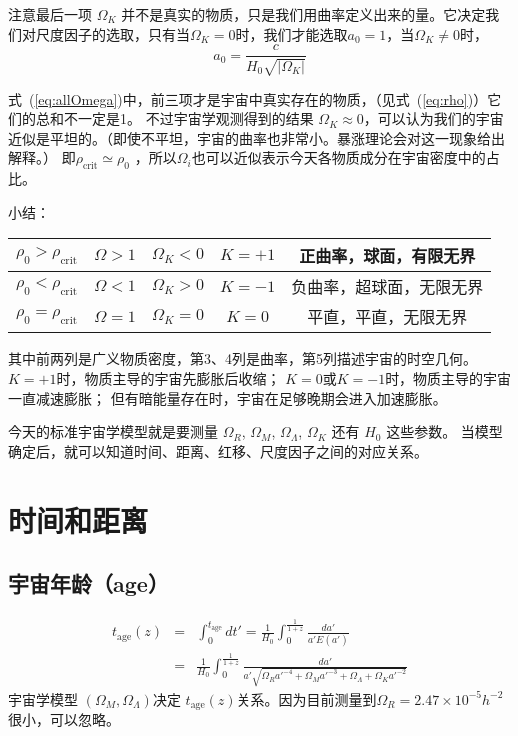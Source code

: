 \documentclass[12pt]{ctexart}
\newcommand{\refeq}[1]{式~(\ref{#1})}
\begin{document}
注意最后一项 $\Omega_K$ 并不是真实的物质，只是我们用曲率定义出来的量。它决定我们对尺度因子的选取，只有当$\Omega_K = 0$时，我们才能选取$a_0=1$，当$\Omega_K\neq 0$时，
\begin{equation}
    a_0=\frac{c}{H_0\sqrt{|\Omega_K|}} 
\end{equation} 


\refeq{eq:allOmega}中，前三项才是宇宙中真实存在的物质，（见\refeq{eq:rho}）它们的总和不一定是1。
不过宇宙学观测得到的结果 $\Omega_K \approx 0$，可以认为我们的宇宙近似是平坦的。（即使不平坦，宇宙的曲率也非常小。暴涨理论会对这一现象给出解释。） 
即$\rho_\text{crit}\simeq\rho_0$ ，所以$\Omega_i$也可以近似表示今天各物质成分在宇宙密度中的占比。

小结：
\begin{table}[H]
    \centering
    \begin{tabular}{|c|c|c|c|c|}
    \hline
    $\rho_0>\rho_\text{crit}$  & $\Omega>1$ & $\Omega_K<0$ & $K=+1$ & 正曲率，球面，有限无界 \\ \hline
    $\rho_0<\rho_\text{crit}$  & $\Omega<1$ & $\Omega_K>0$ & $K=-1$ & 负曲率，超球面，无限无界  \\ \hline
    $\rho_0=\rho_\text{crit}$  & $\Omega=1$ & $\Omega_K=0$ & $K=0$ & 平直，平直，无限无界 \\ \hline
    \end{tabular}
\end{table}
其中前两列是广义物质密度，第3、4列是曲率，第5列描述宇宙的时空几何。
$K=+1$时，物质主导的宇宙先膨胀后收缩；
$K=0$或$K=-1$时，物质主导的宇宙一直减速膨胀；
但有暗能量存在时，宇宙在足够晚期会进入加速膨胀。

今天的标准宇宙学模型就是要测量 $\Omega_R$, $\Omega_M$, $\Omega_\Lambda$, $\Omega_K$ 还有 $H_0$ 这些参数。
当模型确定后，就可以知道时间、距离、红移、尺度因子之间的对应关系。

\section{时间和距离}
\subsection{宇宙年龄（age）}

\begin{eqnarray}
    t_\text{age}(z) &=& \int_0^{t_\text{age}} dt' = \frac{1}{H_0}\int_0^\frac{1}{1+z} \frac{da'}{a' E(a')} \\ 
    &=& \frac{1}{H_0}\int_0^\frac{1}{1+z} \frac{da'}{a' \sqrt{\Omega_R a'^{-4}+\Omega_M a'^{-3}+\Omega_\Lambda+\Omega_K a'^{-2}}}
\end{eqnarray}
宇宙学模型 $\left(\Omega_M, \Omega_\Lambda\right) $决定 $t_\text{age}(z)$关系。因为目前测量到$\Omega_R = 2.47\times10^{-5}h^{-2}$很小，可以忽略。
\end{document}

